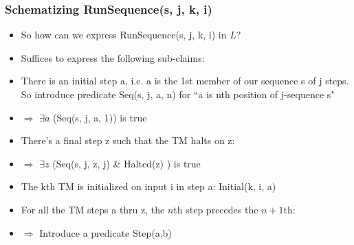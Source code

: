 \begin{frame}
\frametitle{Schematizing \textrm{RunSequence(s, j, k, i)}}

\begin{itemize}[<+->]

\item So how can we express \textrm{RunSequence(s, j, k, i)} in $L$?

\item Suffices to express the following sub-claims:

\bi

\item There is an initial step \textrm{a}, i.e. \textrm{a} is the 1st member of our sequence \textrm{s} of \textrm{j} steps. So introduce predicate \textrm{Seq(s, j, a, n)} for ``\textrm{a} is nth position of \textrm{j}-sequence \textrm{s}" 

\item[] $\Rightarrow$ $\exists a$ (\textrm{Seq(s, j, a, 1)}) is true

\item There's a final step \textrm{z} such that the TM halts on \textrm{z}:

\item[] $\Rightarrow$ $\exists z$ \big (\textrm{Seq(s, j, z, j)} \& \textrm{Halted(z)} \big) is true

\item The kth TM is initialized on input \textrm{i} in step \textrm{a}: \textrm{Initial(k, i, a)}

\item For all the TM steps a thru z, the $n$th step precedes the $n+1$th:
\item[] $\Rightarrow$ Introduce a predicate \textrm{Step(a,b)}

\ei

\end{itemize}
\end{frame}

